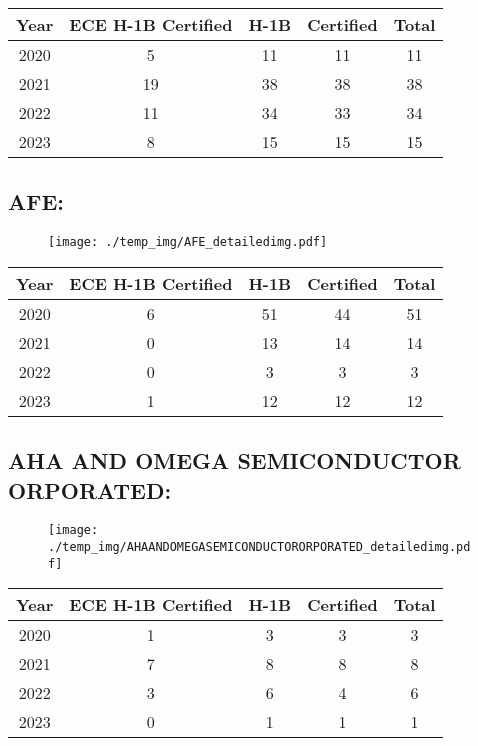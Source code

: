\documentclass{article}%
\begin{document}
%
\begin{longtable}{c|c|c|c|c}%
\hline%
Year&ECE H{-}1B Certified&H{-}1B&Certified&Total\\%
\hline%
2020&5&11&11&11\\%
\hline%
2021&19&38&38&38\\%
\hline%
2022&11&34&33&34\\%
\hline%
2023&8&15&15&15\\%
\hline%
\end{longtable}

%
\newpage%
\subsection{AFE:}%
\label{subsec:AFE}%
\label{AFEdetailed}%


\begin{figure}[htbp]%
\centering%
\texttt{[image: ./temp\_img/AFE\_detailedimg.pdf]}%
\end{figure}

%
\begin{longtable}{c|c|c|c|c}%
\hline%
Year&ECE H{-}1B Certified&H{-}1B&Certified&Total\\%
\hline%
2020&6&51&44&51\\%
\hline%
2021&0&13&14&14\\%
\hline%
2022&0&3&3&3\\%
\hline%
2023&1&12&12&12\\%
\hline%
\end{longtable}

%
\newpage%
\subsection{AHA AND OMEGA SEMICONDUCTOR ORPORATED:}%
\label{subsec:AHAANDOMEGASEMICONDUCTORORPORATED}%
\label{AHAANDOMEGASEMICONDUCTORORPORATEDdetailed}%


\begin{figure}[htbp]%
\centering%
\texttt{[image: ./temp\_img/AHAANDOMEGASEMICONDUCTORORPORATED\_detailedimg.pdf]}%
\end{figure}

%
\begin{longtable}{c|c|c|c|c}%
\hline%
Year&ECE H{-}1B Certified&H{-}1B&Certified&Total\\%
\hline%
2020&1&3&3&3\\%
\hline%
2021&7&8&8&8\\%
\hline%
2022&3&6&4&6\\%
\hline%
2023&0&1&1&1\\%
\hline%
\end{longtable}
\end{document}
